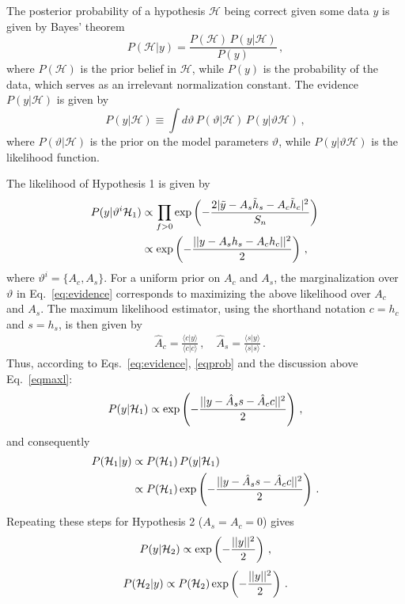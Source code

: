\documentclass[prd,aps,floatfix,superscriptaddress,nofootinbib,twocolumn,10pt,English]{revtex4-1}
\begin{document}
The posterior probability of a hypothesis $\mathcal H$ being correct given some data $y$ 
is given by Bayes' theorem~\cite{Cornish:2007if,Littenberg:2009bm}
\begin{equation}
P(\mathcal{H}|y) = \frac{P(\mathcal{H})\, P(y|\mathcal H)}{P(y)}\,,
\end{equation}
where $P(\mathcal{H})$ is the prior belief in $\mathcal H$, while $P(y)$ 
is the probability of the data, which serves as an irrelevant normalization constant.
The evidence $P(y|\mathcal H)$ is given by
\begin{equation}
\label{eq:evidence}
P(y|\mathcal H) \equiv \int d \vartheta\,P(\vartheta|\mathcal H) \, P(y| \vartheta \mathcal H)\,,
\end{equation}
where $P(\vartheta|\mathcal H)$ is the prior on the model parameters $\vartheta$, while 
$P(y| \vartheta \mathcal H)$ is the likelihood function.

The likelihood of Hypothesis 1 is given by
\begin{align}\label{eqprob}
 P(y|\vartheta^{i} \mathcal{H}_1) &\propto \prod_{f>0} {\rm exp} \left ( -\frac{2 |\tilde y-A_s \tilde h_s-A_c \tilde h_c|^2}{S_n}\right )\,\nonumber \\
 & \propto {\rm exp}\left (- \frac{||y-A_s h_s-A_c h_c||^2}{2}\right )\,,
\end{align}
where $\vartheta^{i}=\{A_c,A_s\}$. For a uniform prior on $A_c$
and $A_s$, the marginalization over $\vartheta$ in
Eq.~\eqref{eq:evidence} corresponds to maximizing the above likelihood
over $A_c$ and $A_s$. The maximum likelihood estimator, using 
the shorthand notation  $c=h_c$ and $s=h_s$, is then given
by
\begin{align}\label{eqmaxl}
& \hat{A}_c =\frac{\langle c | y \rangle}{\langle c | c\rangle}\,, \quad \hat{A}_s =\frac{\langle s | y \rangle}{\langle s | s \rangle}\,.
\end{align}
Thus, according to Eqs.~\eqref{eq:evidence},
\eqref{eqprob} and the discussion above Eq.~\eqref{eqmaxl}:
\begin{align}\label{PyH1}
P(y|\mathcal H_1) \propto {\rm exp}\left (- \frac{||y-\hat A_s s- \hat A_c c||^2}{2}\right )\,,
\end{align}
and consequently
\begin{align}
P(\mathcal H_1|y) &\propto P(\mathcal{H}_1)\, P(y|\mathcal H_1) \nonumber \\
&\propto P(\mathcal{H}_1)\,{\rm exp}\left (- \frac{||y-\hat A_s s- \hat A_c c||^2}{2}\right )\,.
\end{align}
Repeating these steps for Hypothesis 2 ($A_s=A_c=0$) gives
\begin{equation}\label{PyH2}  
  P(y|\mathcal{H}_2) \propto {\rm exp}\left (- \frac{||y||^2}{2}\right )\,,
\end{equation}
\begin{equation}
P(\mathcal H_2|y) \propto P(\mathcal{H}_2)\,{\rm exp}\left (- \frac{||y||^2}{2}\right )\,.
\end{equation}
\end{document}
